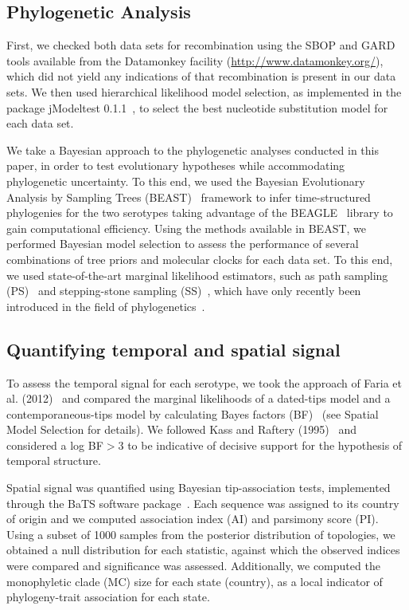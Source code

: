 \documentclass[10pt]{article}
\begin{document}
\subsection*{Phylogenetic Analysis}

First, we checked both data sets for recombination using the SBOP and GARD~\cite{sbpgard} tools available from the Datamonkey facility (\url{http://www.datamonkey.org/}), which did not yield any indications of that recombination is present in our data sets.
We then used hierarchical likelihood model selection, as implemented in the package jModeltest 0.1.1~\cite{jmodel}, to select the best nucleotide substitution model for each data set.

We take a Bayesian approach to the phylogenetic analyses conducted in this paper, in order to test evolutionary hypotheses while accommodating phylogenetic uncertainty. 
To this end, we used the Bayesian Evolutionary Analysis by Sampling Trees (BEAST)~\cite{beast2012} framework to infer time-structured phylogenies for the two serotypes taking advantage of the  BEAGLE~\cite{BEAGLE} library to gain computational efficiency.
Using the methods available in BEAST, we performed Bayesian model selection to assess the performance of several combinations of tree priors and molecular clocks for each data set.
To this end, we used state-of-the-art marginal likelihood estimators, such as path sampling (PS)~\cite{LartillotPhilippe} and stepping-stone sampling (SS)~\cite{Xie}, which have only recently been introduced in the field of phylogenetics~\cite{LartillotPhilippe, Xie, Baele2012, Baele2013a, Baele2013b}.

\subsection*{Quantifying temporal and spatial signal} 

To assess the temporal signal for each serotype, we took the approach of Faria et al. (2012)~\cite{Faria2012} and compared the marginal likelihoods of a dated-tips model and a contemporaneous-tips model by calculating Bayes factors (BF)~\cite{Suchard2001, suchard2005models} (see Spatial Model Selection for details).
We followed Kass and Raftery (1995)~\cite{KassRaftery1995} and considered a log BF$>$3 to be indicative of decisive support for the hypothesis of temporal structure.

Spatial signal was quantified using Bayesian tip-association tests, implemented through the BaTS software package~\cite{bats}.
Each sequence was assigned to its country of origin and we computed association index (AI) and parsimony score (PI). %
Using a subset of 1000 samples from the posterior distribution of topologies, we obtained a null distribution for each statistic, against which the observed indices were compared and significance was assessed.
Additionally, we computed the monophyletic clade (MC) size for each state (country), as a local indicator of phylogeny-trait association for each state.
\end{document}
